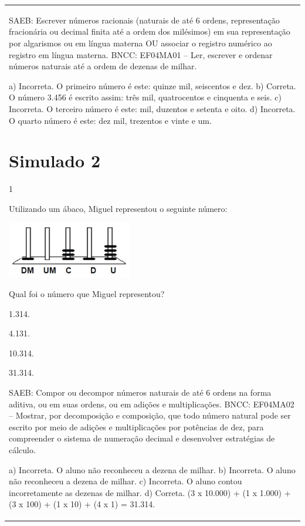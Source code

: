 \begin{mdframed}[linewidth=2pt,linecolor=salmao,roundcorner=2pt]
\begin{escolha}
{{{\begin{longtable}[]{@{}l@{}}
\begin{itemize}
{SAEB: Escrever números racionais (naturais de até 6 ordens, representação
fracionária ou decimal finita até a ordem dos milésimos) em sua
representação por algarismos ou em língua materna OU associar o registro
numérico ao registro em língua materna.
BNCC: EF04MA01 -- Ler, escrever e ordenar números naturais até a ordem de dezenas de milhar.

a) Incorreta. O primeiro número é este: quinze mil, seiscentos e dez.
b) Correta. O número 3.456 é escrito assim: três mil, quatrocentos e cinquenta e seis.
c) Incorreta. O terceiro número é este: mil, duzentos e setenta e oito.
d) Incorreta. O quarto número é este: dez mil, trezentos e vinte e um.

\chapter{Simulado 2}
\markboth{Simulado 2}{}

\num{1}

Utilizando um ábaco, Miguel representou o seguinte número:

\includegraphics[width=2.14744in,height=0.97003in]{media/image152.png}


Qual foi o número que Miguel representou?

\begin{escolha}
\item
  1.314.
\item
  4.131.
\item
  10.314.
\item
  31.314.
\end{escolha}

SAEB: Compor ou decompor números naturais de até 6 ordens na
forma aditiva, ou em suas ordens, ou em adições e multiplicações.
BNCC: EF04MA02 -- Mostrar, por decomposição e composição, que todo número natural pode ser escrito
por meio de adições e multiplicações por potências de dez, para compreender o sistema de
numeração decimal e desenvolver estratégias de cálculo.

a) Incorreta. O aluno não reconheceu a dezena de milhar.
b) Incorreta. O aluno não reconheceu a dezena de milhar.
c) Incorreta. O aluno contou incorretamente as dezenas de milhar.
d) Correta. (3 x 10.000) + (1 x 1.000) + (3 x 100) + (1 x 10) + (4 x 1) = 31.314.

}
\end{itemize}
\end{longtable}}}}
\end{escolha}
\end{mdframed}
